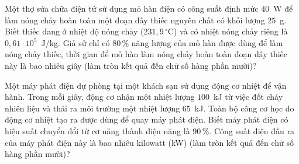 	\begin{ex}%
		Một thợ sửa chữa điện tử sử dụng mỏ hàn điện có công suất định mức $40$~W để làm nóng chảy hoàn toàn một đoạn dây thiếc nguyên chất có khối lượng $25$~g. Biết thiếc đang ở nhiệt độ nóng chảy ($231{,}9\,^\circ\text{C}$) và có nhiệt nóng chảy riêng là $0{,}61\cdot 10^5$~J/kg. Giả sử chỉ có $80\,\%$ năng lượng của mỏ hàn được dùng để làm nóng chảy thiếc, thời gian để mỏ hàn làm nóng chảy hoàn toàn đoạn dây thiếc này là bao nhiêu giây (làm tròn kết quả đến chữ số hàng phần mười)?
		\par
	\end{ex}

	\begin{ex}%
		Một máy phát điện dự phòng tại một khách sạn sử dụng động cơ nhiệt để vận hành. Trong mỗi giây, động cơ nhận một nhiệt lượng $100$~kJ từ việc đốt cháy nhiên liệu và thải ra môi trường một nhiệt lượng $65$~kJ. Toàn bộ công cơ học do động cơ nhiệt tạo ra được dùng để quay máy phát điện. Biết máy phát điện có hiệu suất chuyển đổi từ cơ năng thành điện năng là $90\,\%$. Công suất điện đầu ra của máy phát điện này là bao nhiêu kilowatt (kW) (làm tròn kết quả đến chữ số hàng phần mười)?
		\par
	\end{ex}

